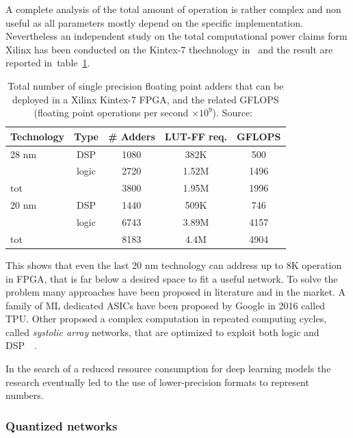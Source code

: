 A complete analysis of the total amount of operation is rather complex and non useful as all parameters mostly depend on the specific implementation. Nevertheless an independent study on the total computational power claims form Xilinx has been conducted on the Kintex-7 thechnology in~\cite{intel_GFLOPS_claims} and the result are reported in~table~\ref{tab:kintex_num_adders}.
\begin{table}[]
    \centering
    \begin{tabular}{l|c|c|c|c}
         \textbf{Technology} & \textbf{Type} & \textbf{\# Adders} & \textbf{LUT-FF req.} & \textbf{GFLOPS} \\
         \hline
         28 nm              & DSP   & 1080 & 382K   & 500  \\
                            & logic & 2720 & 1.52M  & 1496 \\ \hline    
         tot                &       & 3800 & 1.95M  & 1996 \vspace{1cm} \\
         20 nm              & DSP   & 1440 & 509K & 746   \\
                            & logic & 6743 & 3.89M & 4157 \\ \hline    
         tot                &       & 8183 & 4.4M  & 4904 \\
    \end{tabular}
    \caption{Total number of single precision floating point adders that can be deployed in a Xilinx Kintex-7 FPGA, and the related GFLOPS (floating point operations per second $\times 10^9$). Source:~\cite{intel_GFLOPS_claims} }
    \label{tab:kintex_num_adders}
\end{table}
This shows that even the last 20 nm technology can address up to 8K operation in FPGA, that is far below a desired space to fit a useful network.
To solve the problem many approaches have been proposed in literature and in the market. A family of ML dedicated ASICs have been proposed by Google in 2016 called \ac{TPU}. Other proposed a complex computation in repeated computing cycles, called \textit{systolic array} networks, that are optimized to exploit both logic and DSP~\cite{Zhang:2015:OFA:2684746.2689060}~\cite{Wei:2017:ASA:3061639.3062207}.

In the search of a reduced resource consumption for deep learning models the research eventually led to the use of lower-precision formats to represent numbers. 

\subsubsection*{Quantized networks}

